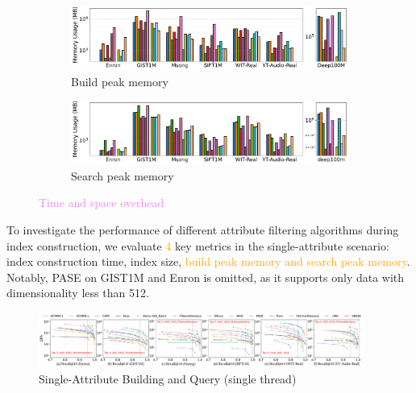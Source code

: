 \documentclass[sigconf, nonacm]{acmart}
\begin{document}
\begin{figure}[t]
\begin{subfigure}{\columnwidth}
			\includegraphics[width=0.99\linewidth]{figures/indexData/exp_7_memory_mb_comparison_query1.pdf}
			\caption{Build peak memory }
			\label{fig:build_memory_mb_comparison}
		\end{subfigure}
		
		\begin{subfigure}{\columnwidth}
			\centering
			
			\includegraphics[width=0.99\linewidth]{figures/searchMem/label_memory_comparison.pdf}
			\caption{Search peak memory}
			\label{fig:search_memory_mb_comparison}
		\end{subfigure}
		
		\caption{\textcolor{violet}{Time and space overhead}}
		\label{fig:build_index_comparison}
	\end{figure}
	
	
	
	To investigate the performance of different attribute filtering algorithms during index construction, we evaluate \textcolor{orange}{4} key metrics in the single-attribute scenario: index construction time, index size, \textcolor{orange}{build peak memory and search peak memory}. Notably, PASE on GIST1M and Enron is omitted, as it supports only data with dimensionality less than 512. 
	
	\begin{figure}
		\centering
		
		\includegraphics[width=0.95\textwidth]{figures/exp/exp_1_1_SingleLabel_1thread.pdf}
		\caption{Single-Attribute Building and Query (single thread) }
		\label{fig:exp_1_1_SingleLabel_1thread}
	\end{figure}
	
\end{document}
